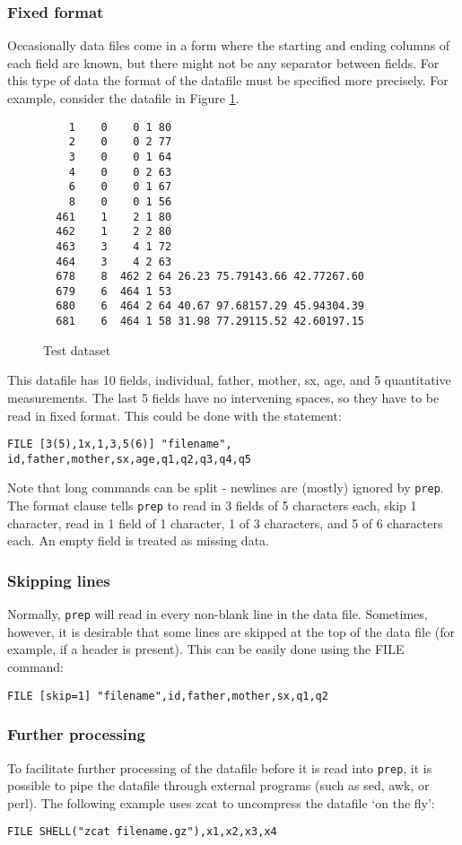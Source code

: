 \documentclass[10pt,a4paper]{article}
\newcommand{\Prep}{\texttt{prep}\xspace}
\begin{document}
\subsubsection{Fixed format}
Occasionally data files come in a form where the starting and ending columns
of each field are known, but there might not be any separator between
fields.  For this type of data the format of the datafile must be specified
more precisely.  For example, consider the datafile in Figure \ref{fig:2}.
\begin{figure}
\caption{\label{fig:2}Test dataset}
\begin{verbatim}
    1    0    0 1 80
    2    0    0 2 77
    3    0    0 1 64
    4    0    0 2 63
    6    0    0 1 67
    8    0    0 1 56
  461    1    2 1 80
  462    1    2 2 80
  463    3    4 1 72
  464    3    4 2 63
  678    8  462 2 64 26.23 75.79143.66 42.77267.60
  679    6  464 1 53
  680    6  464 2 64 40.67 97.68157.29 45.94304.39
  681    6  464 1 58 31.98 77.29115.52 42.60197.15
\end{verbatim}
\end{figure}
This datafile has 10 fields, individual, father, mother, sx, age, and 5
quantitative measurements.  The last 5 fields have no intervening spaces, so
they have to be read in fixed format.  This could be done with the
statement:
\begin{verbatim}
FILE [3(5),1x,1,3,5(6)] "filename",
id,father,mother,sx,age,q1,q2,q3,q4,q5
\end{verbatim}
Note that long commands can be split - newlines are (mostly) ignored by
\Prep.  The format clause tells \Prep to read in 3 fields of 5 characters
each, skip 1 character, read in 1 field of 1 character, 1 of 3 characters,
and 5 of 6 characters each.  An empty field is treated as missing data.
\subsubsection{Skipping lines}
Normally, \Prep will read in every non-blank line in the data file.
Sometimes, however, it is desirable that some lines are skipped at the top
of the data file (for example, if a header is present).  This can be easily
done using the FILE command:
\begin{verbatim}
FILE [skip=1] "filename",id,father,mother,sx,q1,q2
\end{verbatim}
\subsubsection{Further processing}
To facilitate further processing of the datafile before it is read into
\Prep, it is possible to pipe the datafile through external programs (such
as sed, awk, or perl).  The following example uses zcat to uncompress the
datafile `on the fly':
\begin{verbatim}
FILE SHELL("zcat filename.gz"),x1,x2,x3,x4
\end{verbatim}
\end{document}
